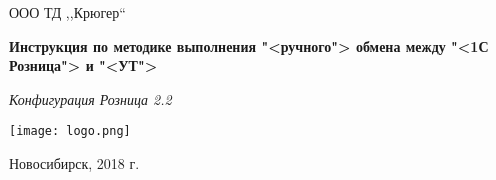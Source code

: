 \begin{titlepage}
  \begin{center}
    \large
  ООО ТД ,,Крюгер``

 
\vspace{2.25cm}

\textbf{Инструкция по методике выполнения "<ручного"> обмена между "<1С Розница"> и "<УТ">} 

\textit{Конфигурация Розница 2.2}
\vfill    
  
{\texttt{[image: logo.png]}}  
  
\end{center}
\vfill

\newlength{\ML}


\begin{center}
  Новосибирск, 2018 г.
\end{center}
\end{titlepage}